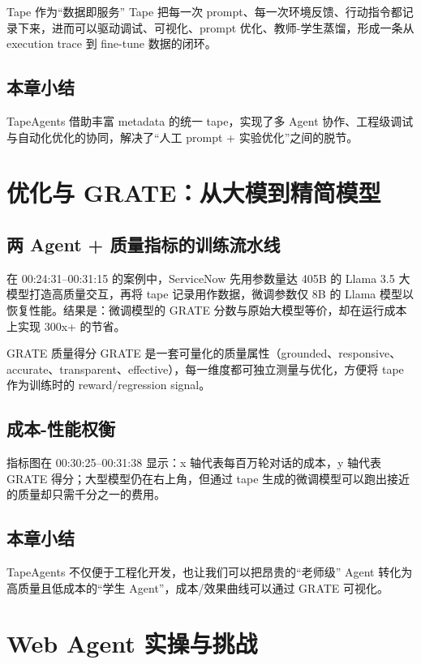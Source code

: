 \documentclass[a4paper]{article}
\begin{document}
\begin{knowledgebox}{Tape 作为“数据即服务”}
Tape 把每一次 prompt、每一次环境反馈、行动指令都记录下来，进而可以驱动调试、可视化、prompt 优化、教师-学生蒸馏，形成一条从 execution trace 到 fine-tune 数据的闭环。
\end{knowledgebox}

\subsection{本章小结}
TapeAgents 借助丰富 metadata 的统一 tape，实现了多 Agent 协作、工程级调试与自动化优化的协同，解决了“人工 prompt + 实验优化”之间的脱节。

\section{优化与 GRATE：从大模到精简模型}
\subsection{两 Agent + 质量指标的训练流水线}
在 00:24:31--00:31:15 的案例中，ServiceNow 先用参数量达 405B 的 Llama 3.5 大模型打造高质量交互，再将 tape 记录用作数据，微调参数仅 8B 的 Llama 模型以恢复性能。结果是：微调模型的 GRATE 分数与原始大模型等价，却在运行成本上实现 300x+ 的节省。

\begin{knowledgebox}{GRATE 质量得分}
GRATE 是一套可量化的质量属性（grounded、responsive、accurate、transparent、effective），每一维度都可独立测量与优化，方便将 tape 作为训练时的 reward/regression signal。
\end{knowledgebox}

\subsection{成本-性能权衡}
指标图在 00:30:25--00:31:38 显示：x 轴代表每百万轮对话的成本，y 轴代表 GRATE 得分；大型模型仍在右上角，但通过 tape 生成的微调模型可以跑出接近的质量却只需千分之一的费用。

\subsection{本章小结}
TapeAgents 不仅便于工程化开发，也让我们可以把昂贵的“老师级” Agent 转化为高质量且低成本的“学生 Agent”，成本/效果曲线可以通过 GRATE 可视化。

\section{Web Agent 实操与挑战}
\end{document}
